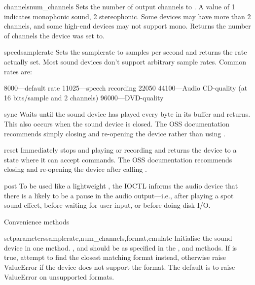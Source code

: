 \begin{methoddesc}{channels}{num_channels}
Sets the number of output channels to .  A value of 1
indicates monophonic sound, 2 stereophonic.  Some devices may have more
than 2 channels, and some high-end devices may not support mono.
Returns the number of channels the device was set to.
\end{methoddesc}

\begin{methoddesc}{speed}{samplerate}
Sets the samplerate to  samples per second and returns
the rate actually set.  Most sound devices don't support arbitrary
sample rates.  Common rates are:

8000---default rate
11025---speech recording
22050
44100---Audio CD-quality (at 16 bits/sample and 2 channels)
96000---DVD-quality
\end{methoddesc}

\begin{methoddesc}{sync}
Waits until the sound device has played every byte in its buffer and
returns.  This also occurs when the sound device is closed.  The OSS
documentation recommends simply closing and re-opening the device rather
than using .
\end{methoddesc}

\begin{methoddesc}{reset}
Immediately stops and playing or recording and returns the device to a
state where it can accept commands.  The OSS documentation recommends
closing and re-opening the device after calling .
\end{methoddesc}

\begin{methoddesc}{post}
To be used like a lightweight , the 
IOCTL informs the audio device that there is a likely to be a pause in
the audio output---i.e., after playing a spot sound effect, before
waiting for user input, or before doing disk I/O.
\end{methoddesc}

Convenience methods

\begin{methoddesc}{setparameters}{samplerate,num_channels,format,emulate}
Initialise the sound device in one method.  ,
 and  should be as specified in the
,  and 
methods.  If  is true, attempt to find the closest matching
format instead, otherwise raise ValueError if the device does not
support the format.  The default is to raise ValueError on unsupported
formats.
\end{methoddesc}

